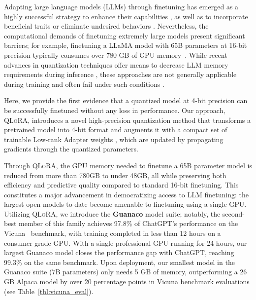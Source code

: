 Adapting large language models (LLMs) through finetuning has emerged as a highly successful strategy to enhance their capabilities \citep{min2021metaicl, wei2021finetuned, ouyang2022training, wang2022super, wang2022self, liu2022few}, as well as to incorporate beneficial traits or eliminate undesired behaviors \citep{ouyang2022training,askell2021general,bai2022training}. Nevertheless, the computational demands of finetuning extremely large models present significant barriers; for example, finetuning a LLaMA model with 65B parameters at 16-bit precision typically consumes over 780 GB of GPU memory~\citep{touvron2023llama}. While recent advances in quantization techniques offer means to decrease LLM memory requirements during inference \citep{dettmers2022llm, dettmers2022case, frantar2022gptq, xiao2022smoothquant}, these approaches are not generally applicable during training and often fail under such conditions \citep{wortsman2023stable}.

Here, we provide the first evidence that a quantized model at 4-bit precision can be successfully finetuned without any loss in performance. Our approach, \textsc{QLoRA}, introduces a novel high-precision quantization method that transforms a pretrained model into 4-bit format and augments it with a compact set of trainable Low-rank Adapter weights \citep{hu2021lora}, which are updated by propagating gradients through the quantized parameters.

Through \textsc{QLoRA}, the GPU memory needed to finetune a 65B parameter model is reduced from more than 780GB to under 48GB, all while preserving both efficiency and predictive quality compared to standard 16-bit finetuning. This constitutes a major advancement in democratizing access to LLM finetuning: the largest open models to date become amenable to finetuning using a single GPU. Utilizing \textsc{QLoRA}, we introduce the \textbf{Guanaco} model suite; notably, the second-best member of this family achieves 97.8\% of ChatGPT’s performance on the Vicuna~\citep{vicuna2023} benchmark, with training completed in less than 12 hours on a consumer-grade GPU. With a single professional GPU running for 24 hours, our largest Guanaco model closes the performance gap with ChatGPT, reaching 99.3\% on the same benchmark. Upon deployment, our smallest model in the Guanaco suite (7B parameters) only needs 5 GB of memory, outperforming a 26 GB Alpaca model by over 20 percentage points in Vicuna benchmark evaluations (see Table~\ref{tbl:vicuna_eval}).

